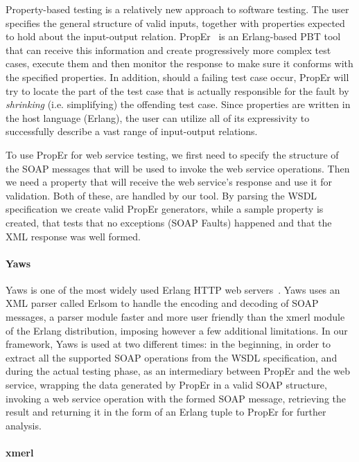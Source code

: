\documentclass[copyright]{eptcs}
\begin{document}
Property-based testing is a relatively new approach to software
testing. The user specifies the general structure of valid inputs,
together with properties expected to hold about the input-output
relation. PropEr~\cite{proper_tool} is an Erlang-based PBT tool that
can receive this information and create progressively more complex
test cases, execute them and then monitor the response to make sure it
conforms with the specified properties. In addition, should a failing
test case occur, PropEr will try to locate the part of the test case
that is actually responsible for the fault by \emph{shrinking} (i.e.
simplifying) the offending test case. Since properties are written in
the host language (Erlang), the user can utilize all of its
expressivity to successfully describe a vast range of input-output
relations.

To use PropEr for web service testing, we first need to specify the structure
of the SOAP messages that will be used to invoke the web service operations. 
Then we need a property that will receive the web service's response and use 
it for validation. Both of these, are handled by our tool. By parsing the 
WSDL specification we create valid PropEr generators, while a sample property
is created, that tests that no exceptions (SOAP Faults) happened and that the 
XML response was well formed.

\paragraph{Yaws}

Yaws is one of the most widely used Erlang HTTP web servers~\cite{yaws}.
Yaws uses an XML parser called Erlsom to handle the encoding and decoding
of SOAP messages, a parser module faster and more user friendly than
the xmerl module of the Erlang distribution, imposing however a few
additional limitations. In our framework, Yaws is used at two
different times: in the beginning, in order to extract all the
supported SOAP operations from the WSDL specification, and during the
actual testing phase, as an intermediary between PropEr and the web
service, wrapping the data generated by PropEr in a valid SOAP
structure, invoking a web service operation with the formed SOAP
message, retrieving the result and returning it in the form of an
Erlang tuple to PropEr for further analysis.

\paragraph{xmerl}
\end{document}
